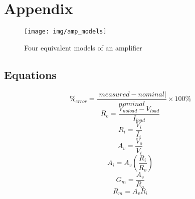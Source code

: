 \documentclass{article}
\begin{document}
\section{Appendix}
\label{sec:appendix}

\begin{figure}[hbtp]
  \centering
  \texttt{[image: img/amp\_models]}
  \caption{\label{fig:amp_models} Four equivalent models of an amplifier}
\end{figure}

\subsection*{Equations}

\begin{equation}
  \label{eqn:percent_error}
  \%_{error} = \frac{|measured - nominal|}{nominal} \times 100\%
\end{equation}
%
\begin{equation}
  \label{eqn:R_o}
  R_o = \frac{V_{noload} - V_{load}}{I_{load}}
\end{equation}
%
\begin{equation}
  \label{eqn:R_i}
  R_i = \frac{V_i}{I_i}
\end{equation}
%
\begin{equation}
  \label{eqn:A_v}
  A_v = \frac{V_o}{V_i}
\end{equation}
%
\begin{equation}
  \label{eqn:A_i}
  A_i = A_v \left(\frac{R_i}{R_o}\right)
\end{equation}
%
\begin{equation}
  \label{eqn:G_m}
  G_m = \frac{A_v}{R_o}
\end{equation}
%
\begin{equation}
  \label{eqn:R_m}
  R_m = A_v R_i
\end{equation}
\end{document}
